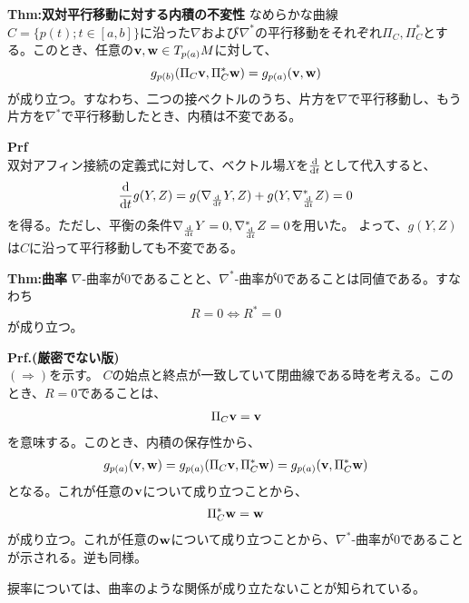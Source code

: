 \documentclass[a4paper,11pt]{jsarticle}
\numberwithin{equation}{section}
\begin{document}
\begin{itembox}[l]{\textbf{Thm:双対平行移動に対する内積の不変性}}
    なめらかな曲線$C = \{p(t) ; t \in [a,b]\}$に沿った$\nabla$および$\nabla^*$の平行移動をそれぞれ$\Pi_C,\Pi_C^*$とする。このとき、任意の$\vb{v},\vb{w} \in T_{p(a)}M$に対して、
    \begin{equation}
        g_{p(b)}(\Pi_C \vb{v},\Pi_C^* \vb{w}) = g_{p(a)}(\vb{v},\vb{w})
    \end{equation}
    が成り立つ。すなわち、二つの接ベクトルのうち、片方を$\nabla$で平行移動し、もう片方を$\nabla^*$で平行移動したとき、内積は不変である。
\end{itembox}
\textbf{Prf}\\
双対アフィン接続の定義式に対して、ベクトル場$X$を$\dv{t}$として代入すると、
\begin{align}
    \dv{t}g(Y,Z) =g(\nabla_{\dv{t}}Y,Z) + g(Y,\nabla^*_{\dv{t}}Z)=0
\end{align}
を得る。ただし、平衡の条件$\nabla_{\dv{t}}Y=0,\nabla^*_{\dv{t}}Z=0$を用いた。
よって、$g(Y,Z)$は$C$に沿って平行移動しても不変である。\hfill\qedsymbol

\begin{itembox}[l]{\textbf{Thm:曲率}}
    $\nabla$-曲率が0であることと、$\nabla^*$-曲率が0であることは同値である。すなわち
    \begin{equation}
        R = 0 \Leftrightarrow R^* = 0
    \end{equation}
    が成り立つ。
\end{itembox}
\textbf{Prf.(厳密でない版)}\\
$(\Rightarrow)$を示す。
$C$の始点と終点が一致していて閉曲線である時を考える。このとき、$R=0$であることは、
\begin{align}
    \Pi_C \vb{v} = \vb{v} 
\end{align}
を意味する。このとき、内積の保存性から、
\begin{align}
    g_{p(a)}(\vb{v},\vb{w}) = g_{p(a)}(\Pi_C \vb{v},\Pi_C^* \vb{w}) = g_{p(a)}(\vb{v},\Pi_C^* \vb{w})
\end{align}
となる。これが任意の$\vb{v}$について成り立つことから、
\begin{align}
    \Pi_C^* \vb{w} = \vb{w}
\end{align}
が成り立つ。これが任意の$\vb{w}$について成り立つことから、$\nabla^*$-曲率が0であることが示される。逆も同様。\hfill\qedsymbol

捩率については、曲率のような関係が成り立たないことが知られている。
\end{document}
